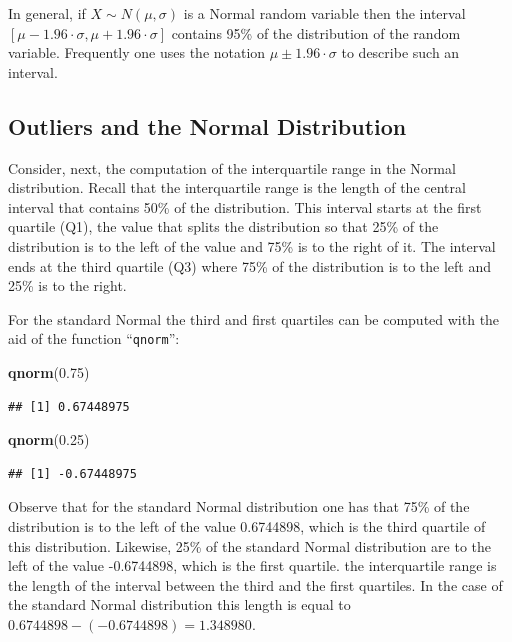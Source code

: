 \documentclass[]{krantz}
\makeatletter
\newenvironment{Shaded}{\begin{snugshade}}{\end{snugshade}}
\newcommand{\KeywordTok}[1]{\textcolor[rgb]{0.13,0.29,0.53}{\textbf{#1}}}
\newcommand{\FloatTok}[1]{\textcolor[rgb]{0.00,0.00,0.81}{#1}}
\newcommand{\NormalTok}[1]{#1}
\newenvironment{kframe}{%
\medskip{}
\setlength{\fboxsep}{.8em}
 \def\at@end@of@kframe{}%
 \ifinner\ifhmode%
  \def\at@end@of@kframe{\end{minipage}}%
  \begin{minipage}{\columnwidth}%
 \fi\fi%
 \def\FrameCommand##1{\hskip\@totalleftmargin \hskip-\fboxsep
 \colorbox{shadecolor}{##1}\hskip-\fboxsep
     \hskip-\linewidth \hskip-\@totalleftmargin \hskip\columnwidth}%
 \MakeFramed {\advance\hsize-\width
   \@totalleftmargin\z@ \linewidth\hsize
   \@setminipage}}%
 {\par\unskip\endMakeFramed%
 \at@end@of@kframe}
\renewenvironment{Shaded}{\begin{kframe}}{\end{kframe}}
\theoremstyle{definition}
\theoremstyle{definition}
\theoremstyle{definition}
\theoremstyle{remark}
\makeatother
\begin{document}
In general, if \(X \sim N(\mu,\sigma)\) is a Normal random variable then
the interval \([\mu - 1.96 \cdot \sigma, \mu + 1.96 \cdot \sigma]\)
contains 95\% of the distribution of the random variable. Frequently one
uses the notation \(\mu \pm 1.96 \cdot \sigma\) to describe such an
interval.

\subsection{Outliers and the Normal
Distribution}\label{outliers-and-the-normal-distribution}

Consider, next, the computation of the interquartile range in the Normal
distribution. Recall that the interquartile range is the length of the
central interval that contains 50\% of the distribution. This interval
starts at the first quartile (Q1), the value that splits the
distribution so that 25\% of the distribution is to the left of the
value and 75\% is to the right of it. The interval ends at the third
quartile (Q3) where 75\% of the distribution is to the left and 25\% is
to the right.

For the standard Normal the third and first quartiles can be computed
with the aid of the function ``\texttt{qnorm}'':

\begin{Shaded}
\begin{Highlighting}[]
\KeywordTok{qnorm}\NormalTok{(}\FloatTok{0.75}\NormalTok{)}
\end{Highlighting}
\end{Shaded}

\begin{verbatim}
## [1] 0.67448975
\end{verbatim}

\begin{Shaded}
\begin{Highlighting}[]
\KeywordTok{qnorm}\NormalTok{(}\FloatTok{0.25}\NormalTok{)}
\end{Highlighting}
\end{Shaded}

\begin{verbatim}
## [1] -0.67448975
\end{verbatim}

Observe that for the standard Normal distribution one has that 75\% of
the distribution is to the left of the value 0.6744898, which is the
third quartile of this distribution. Likewise, 25\% of the standard
Normal distribution are to the left of the value -0.6744898, which is
the first quartile. the interquartile range is the length of the
interval between the third and the first quartiles. In the case of the
standard Normal distribution this length is equal to
\(0.6744898 - (-0.6744898) = 1.348980\).
\end{document}
